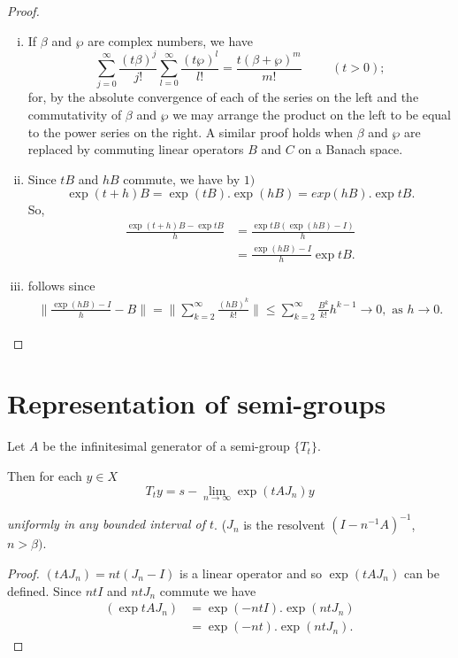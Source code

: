 \begin{proof}
 \begin{enumerate}[i)]
 \item If $\beta$ and $\wp $ are complex numbers, we have 
  $$
  \sum_{ j = 0}^{\infty} \frac{(t\beta)^j}{j!} \sum^\infty_{ l = 0}
  \frac{(t \wp)^l}{l!} = \frac{t( \beta + \wp)^m}{m!} \hspace{1cm}(t
  > 0); 
  $$
  for, by the absolute convergence of each of the series on the left
  and the commutativity of $\beta$ and $\wp$ we may arrange the
  product on the left to be equal to the power series on the
  right. A similar proof holds when $\beta$ and $\wp$ are replaced
  by commuting linear operators $B$ and $C$ on a Banach space. 
 \item Since $tB$ and $hB$ commute, we have by $1)$
  $$
  \exp (t + h )B = \exp (tB). \exp (hB) = exp (hB). \exp tB.
  $$  
  So,
  \begin{align*}
   \frac{\exp (t + h)B - \exp tB}{h} & = \frac{\exp tB (\exp
    (hB) - I)}{h}\\ 
   & = \frac{\exp (hB) - I}{h}\exp tB.
  \end{align*}
 \item follows since 
  \begin{align*}
   \Big\|\frac{\exp (hB) - I}{h} - B \Big\| = \Big\| \sum_{k = 2}^{ \infty}
   \frac{(hB)^k}{k!}\Big\| 
   \leq \sum_{ k = 2}^{\infty} \frac{B^k}{k!} h^{ k - 1} \to 0,
   \text{ as } h \to 0. 
  \end{align*}
 \end{enumerate}
\end{proof}

\section{Representation of semi-groups}\label{chap7:sec2} \pageoriginale

\begin{theorem*}
 Let $A$ be the infinitesimal generator of a semi-group $\{T_t\}$.
\end{theorem*}

Then for each $y \in X$
$$
T_t y = s- \lim_{n \to \infty} \exp (t A J_n) y
$$ 

\textit{uniformly in any bounded interval of $t$}. ($J_n$ is the
resolvent $(I-n^{-1}A)^{-1}$, $n > \beta )$. 

\begin{proof}
 $(t A J_n)= nt (J_n -I)$ is a linear operator and so $\exp(t A
 J_n)$ can be defined. Since $n t I$ and $nt J_n$ commute we have 
 \begin{align*}
  (\exp t A J_n) &= \exp (-n t I). \exp (n t J_n) \\
  &= \exp (-nt). \exp (n t J_n).
 \end{align*}
\end{proof}


